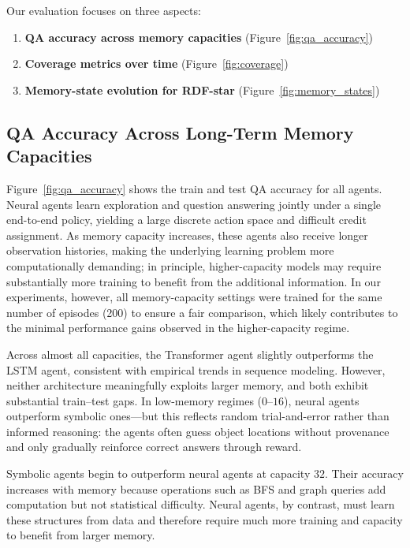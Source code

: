 \documentclass[runningheads]{llncs}
\begin{document}
Our evaluation focuses on three aspects:

\begin{enumerate}
    \item \textbf{QA accuracy across memory capacities} (Figure~\ref{fig:qa_accuracy})
    \item \textbf{Coverage metrics over time} (Figure~\ref{fig:coverage})
    \item \textbf{Memory-state evolution for RDF-star} (Figure~\ref{fig:memory_states})
\end{enumerate}

\subsection{QA Accuracy Across Long-Term Memory Capacities}

Figure~\ref{fig:qa_accuracy} shows the train and test QA accuracy for all agents.
Neural agents learn exploration and question answering jointly under a single end-to-end policy, yielding a large discrete action space and difficult credit assignment. As memory capacity increases, these agents also receive longer observation histories, making the underlying learning problem more computationally demanding; in principle, higher-capacity models may require substantially more training to benefit from the additional information. In our experiments, however, all memory-capacity settings were trained for the same number of episodes (200) to ensure a fair comparison, which likely contributes to the minimal performance gains observed in the higher-capacity regime.


Across almost all capacities, the Transformer agent slightly outperforms the LSTM agent, consistent with empirical trends in sequence modeling. However, neither architecture meaningfully exploits larger memory, and both exhibit substantial train--test gaps. In low-memory regimes ($0$--$16$), neural agents outperform symbolic ones---but this reflects random trial-and-error rather than informed reasoning: the agents often guess object locations without provenance and only gradually reinforce correct answers through reward.

Symbolic agents begin to outperform neural agents at capacity $32$. Their
accuracy increases with memory because operations such as BFS and graph queries
add computation but not statistical difficulty. Neural agents, by contrast, must
learn these structures from data and therefore require much more training and
capacity to benefit from larger memory.
\end{document}

